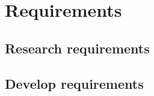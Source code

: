 \section{Requirements}
\label{section:requirements}
\subsection{Research requirements}
\subsection{Develop requirements}